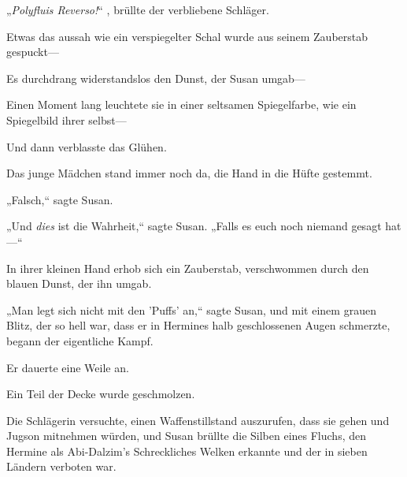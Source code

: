 „\emph{Polyfluis Reverso!}“ , brüllte der verbliebene Schläger.

Etwas das aussah wie ein verspiegelter Schal wurde aus seinem Zauberstab gespuckt—

Es durchdrang widerstandslos den Dunst, der Susan umgab—

Einen Moment lang leuchtete sie in einer seltsamen Spiegelfarbe, wie ein Spiegelbild ihrer selbst—

Und dann verblasste das Glühen.

Das junge Mädchen stand immer noch da, die Hand in die Hüfte gestemmt.

„Falsch,“ sagte Susan.

„Und \emph{dies} ist die Wahrheit,“ sagte Susan. „Falls es euch noch niemand gesagt hat—“

In ihrer kleinen Hand erhob sich ein Zauberstab, verschwommen durch den blauen Dunst, der ihn umgab.

„Man legt sich nicht mit den 'Puffs' an,“ sagte Susan, und mit einem grauen Blitz, der so hell war, dass er in Hermines halb geschlossenen Augen schmerzte, begann der eigentliche Kampf.

Er dauerte eine Weile an.

Ein Teil der Decke wurde geschmolzen.

Die Schlägerin versuchte, einen Waffenstillstand auszurufen, dass sie gehen und Jugson mitnehmen würden, und Susan brüllte die Silben eines Fluchs, den Hermine als Abi-Dalzim's Schreckliches Welken erkannte und der in sieben Ländern verboten war.

